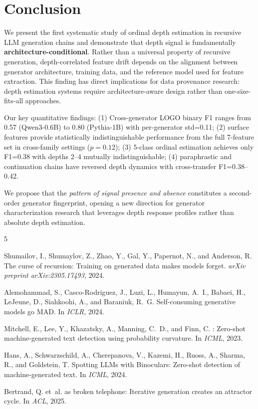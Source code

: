 \documentclass[11pt,a4paper]{article}
\begin{document}
\section{Conclusion}

We present the first systematic study of ordinal depth estimation in recursive LLM generation chains and demonstrate that depth signal is fundamentally \textbf{architecture-conditional}. Rather than a universal property of recursive generation, depth-correlated feature drift depends on the alignment between generator architecture, training data, and the reference model used for feature extraction. This finding has direct implications for data provenance research: depth estimation systems require architecture-aware design rather than one-size-fits-all approaches.

Our key quantitative findings: (1) Cross-generator LOGO binary F1 ranges from 0.57 (Qwen3-0.6B) to 0.80 (Pythia-1B) with per-generator std=0.11; (2) surface features provide statistically indistinguishable performance from the full 7-feature set in cross-family settings ($p=0.12$); (3) 5-class ordinal estimation achieves only F1=0.38 with depths 2--4 mutually indistinguishable; (4) paraphrastic and continuation chains have reversed depth dynamics with cross-transfer F1=0.38--0.42.

We propose that the \emph{pattern of signal presence and absence} constitutes a second-order generator fingerprint, opening a new direction for generator characterization research that leverages depth response profiles rather than absolute depth estimation.

\begin{thebibliography}{5}
\providecommand{\natexlab}[1]{#1}

Shumailov, I., Shumaylov, Z., Zhao, Y., Gal, Y., Papernot, N., and Anderson, R.
\newblock The curse of recursion: Training on generated data makes models forget.
\newblock \emph{arXiv preprint arXiv:2305.17493}, 2024.

Alemohammad, S., Casco-Rodriguez, J., Luzi, L., Humayun, A.~I., Babaei, H., LeJeune, D., Siahkoohi, A., and Baraniuk, R.~G.
\newblock Self-consuming generative models go {MAD}.
\newblock In \emph{ICLR}, 2024.

Mitchell, E., Lee, Y., Khazatsky, A., Manning, C.~D., and Finn, C.
: Zero-shot machine-generated text detection using probability curvature.
\newblock In \emph{ICML}, 2023.

Hans, A., Schwarzschild, A., Cherepanova, V., Kazemi, H., Ruoss, A., Sharma, R., and Goldstein, T.
\newblock Spotting {LLMs} with {Binoculars}: Zero-shot detection of machine-generated text.
\newblock In \emph{ICML}, 2024.

Bertrand, Q. et~al.
 as broken telephone: Iterative generation creates an attractor cycle.
\newblock In \emph{ACL}, 2025.

\end{thebibliography}
\end{document}
